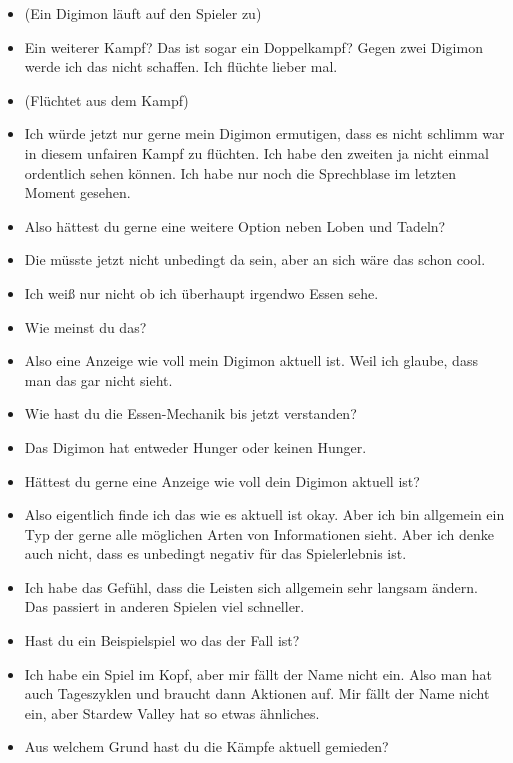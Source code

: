 {\begin{itemize}[]
    \item {} (Ein Digimon läuft auf den Spieler zu)
    \item {} Ein weiterer Kampf? Das ist sogar ein Doppelkampf? Gegen zwei Digimon werde ich das nicht schaffen. Ich flüchte lieber mal. 
    \item {} (Flüchtet aus dem Kampf)
    \item {} Ich würde jetzt nur gerne mein Digimon ermutigen, dass es nicht schlimm war in diesem unfairen Kampf zu flüchten. Ich habe den zweiten ja nicht einmal ordentlich sehen können. Ich habe nur noch die Sprechblase im letzten Moment gesehen.
    \item {} Also hättest du gerne eine weitere Option neben Loben und Tadeln?
    \item {} Die müsste jetzt nicht unbedingt da sein, aber an sich wäre das schon cool. 
    \item {} Ich weiß nur nicht ob ich überhaupt irgendwo Essen sehe.
    \item {} Wie meinst du das?
    \item {} Also eine Anzeige wie voll mein Digimon aktuell ist. Weil ich glaube, dass man das gar nicht sieht. 
    \item {} Wie hast du die Essen-Mechanik bis jetzt verstanden?
    \item {} Das Digimon hat entweder Hunger oder keinen Hunger.
    \item {} Hättest du gerne eine Anzeige wie voll dein Digimon aktuell ist?
    \item {} Also eigentlich finde ich das wie es aktuell ist okay. Aber ich bin allgemein ein Typ der gerne alle möglichen Arten von Informationen sieht. Aber ich denke auch nicht, dass es unbedingt negativ für das Spielerlebnis ist. 
    \item {} Ich habe das Gefühl, dass die Leisten sich allgemein sehr langsam ändern. Das passiert in anderen Spielen viel schneller.
    \item {} Hast du ein Beispielspiel wo das der Fall ist?
    \item {} Ich habe ein Spiel im Kopf, aber mir fällt der Name nicht ein. Also man hat auch Tageszyklen und braucht dann Aktionen auf. Mir fällt der Name nicht ein, aber Stardew Valley hat so etwas ähnliches.
    \item {} Aus welchem Grund hast du die Kämpfe aktuell gemieden?

\end{itemize}}
